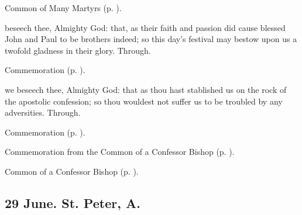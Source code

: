 
\begin{rubric}
	Common of Many Martyrs (p. \pageref{CommonMartyrs}).
\end{rubric}

{} beseech thee, Almighty God: that, as their faith and passion did cause blessed John and Paul to be brothers indeed; so this day's festival may bestow upon us a twofold gladness in their glory. Through.

\begin{rubric}
	Commemoration  (p. \pageref{JohnBaptistCollect}).
\end{rubric}


\clearpage
{}

{} we beseech thee, Almighty God: that as thou hast stablished us on the rock of the apostolic confession; so thou wouldest not suffer us to be troubled by any adversities. Through.

\begin{rubric}
	Commemoration  (p. \pageref{JohnBaptistCollect}).
\end{rubric}

\begin{rubric}
	Commemoration  from the Common of a Confessor Bishop (p. \pageref{ConfessorBishopCollect}).
\end{rubric}



\begin{rubric}
	Common of a Confessor Bishop (p. \pageref{ConfessorBishopCollect}).
\end{rubric}



\subsection{{\color{FestiveWhite}29 June. St. Peter,} {\color{RubricRed}A.}}\label{SaintPeter}

